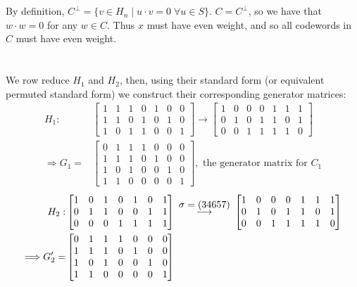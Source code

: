 \documentclass{article}
\begin{document}
\section{} %
By definition, $C^\perp=\{v\in H_n\mid u\cdot v=0\;\forall u\in S\}$.
$C=C^\perp$, so we have that $w\cdot w=0$ for any $w\in C$. Thus $x$ must have
even weight, and so all codewords in $C$ must have even weight.

\section{} %
\subsection{} %
We row reduce $H_1$ and $H_2$, then, using their standard form (or equivalent
permuted standard form) we construct their corresponding generator matrices:
\begin{align*}
	H_1:
	&\begin{bmatrix}
		1 & 1 & 1 & 0 & 1 & 0 & 0\\
		1 & 1 & 0 & 1 & 0 & 1 & 0\\
		1 & 0 & 1 & 1 & 0 & 0 & 1
	\end{bmatrix}
	\longrightarrow
	\begin{bmatrix}
		1 & 0 & 0 & 0 & 1 & 1 & 1\\
		0 & 1 & 0 & 1 & 1 & 0 & 1\\
		0 & 0 & 1 & 1 & 1 & 1 & 0
	\end{bmatrix}\\
	\Longrightarrow G_1=
	&\begin{bmatrix}
		0 & 1 & 1 & 1 & 0 & 0 & 0\\
		1 & 1 & 1 & 0 & 1 & 0 & 0\\
		1 & 0 & 1 & 0 & 0 & 1 & 0\\
		1 & 1 & 0 & 0 & 0 & 0 & 1
	\end{bmatrix},\text{ the generator matrix for $C_1$}
\end{align*}
\newline
\begin{align*}
	H_2:
	&\begin{bmatrix}
		1 & 0 & 1 & 0 & 1 & 0 & 1\\
		0 & 1 & 1 & 0 & 0 & 1 & 1\\
		0 & 0 & 0 & 1 & 1 & 1 & 1
	\end{bmatrix}
	\qquad\stackrel{\mathclap{\normalfont\mbox{$\sigma=(34657)$}}}{\longrightarrow}\qquad
	\begin{bmatrix}
		1 & 0 & 0 & 0 & 1 & 1 & 1\\
		0 & 1 & 0 & 1 & 1 & 0 & 1\\
		0 & 0 & 1 & 1 & 1 & 1 & 0
	\end{bmatrix}\\
	\Longrightarrow G_2'=
	&\begin{bmatrix}
		0 & 1 & 1 & 1 & 0 & 0 & 0\\
		1 & 1 & 1 & 0 & 1 & 0 & 0\\
		1 & 0 & 1 & 0 & 0 & 1 & 0\\
		1 & 1 & 0 & 0 & 0 & 0 & 1
	\end{bmatrix}
\end{align*}
\end{document}

